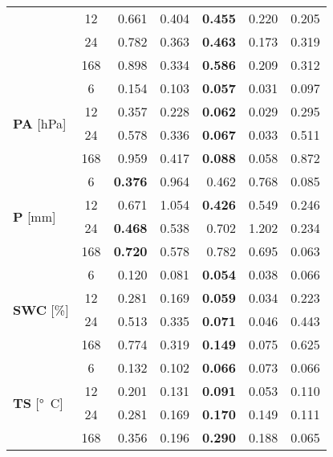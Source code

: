 \begin{table}
\begin{tabular}{p{2.1cm}c|rr|rr|r}
 & 12 & 0.661 & 0.404 & \bfseries 0.455 & 0.220 & 0.205 \\
 & 24 & 0.782 & 0.363 & \bfseries 0.463 & 0.173 & 0.319 \\
 & 168 & 0.898 & 0.334 & \bfseries 0.586 & 0.209 & 0.312 \\
\cline{1-7}
\multirow[c]{4}{*}{\parbox{2.1cm}{\textbf{PA} [\si{hPa}]}} & 6 & 0.154 & 0.103 & \bfseries 0.057 & 0.031 & 0.097 \\
 & 12 & 0.357 & 0.228 & \bfseries 0.062 & 0.029 & 0.295 \\
 & 24 & 0.578 & 0.336 & \bfseries 0.067 & 0.033 & 0.511 \\
 & 168 & 0.959 & 0.417 & \bfseries 0.088 & 0.058 & 0.872 \\
\cline{1-7}
\multirow[c]{4}{*}{\parbox{2.1cm}{\textbf{P} [\si{mm}]}} & 6 & \bfseries 0.376 & 0.964 & 0.462 & 0.768 & 0.085 \\
 & 12 & 0.671 & 1.054 & \bfseries 0.426 & 0.549 & 0.246 \\
 & 24 & \bfseries 0.468 & 0.538 & 0.702 & 1.202 & 0.234 \\
 & 168 & \bfseries 0.720 & 0.578 & 0.782 & 0.695 & 0.063 \\
\cline{1-7}
\multirow[c]{4}{*}{\parbox{2.1cm}{\textbf{SWC} [\si{\%}]}} & 6 & 0.120 & 0.081 & \bfseries 0.054 & 0.038 & 0.066 \\
 & 12 & 0.281 & 0.169 & \bfseries 0.059 & 0.034 & 0.223 \\
 & 24 & 0.513 & 0.335 & \bfseries 0.071 & 0.046 & 0.443 \\
 & 168 & 0.774 & 0.319 & \bfseries 0.149 & 0.075 & 0.625 \\
\cline{1-7}
\multirow[c]{4}{*}{\parbox{2.1cm}{\textbf{TS} [\si{°C}]}} & 6 & 0.132 & 0.102 & \bfseries 0.066 & 0.073 & 0.066 \\
 & 12 & 0.201 & 0.131 & \bfseries 0.091 & 0.053 & 0.110 \\
 & 24 & 0.281 & 0.169 & \bfseries 0.170 & 0.149 & 0.111 \\
 & 168 & 0.356 & 0.196 & \bfseries 0.290 & 0.188 & 0.065 \\
\cline{1-7}
\bottomrule
\end{tabular}
\end{table}
